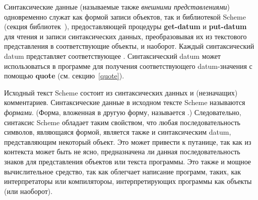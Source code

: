 Синтаксические данные (называемые также \textit{внешними представлениями}) одновременно служат как формой записи объектов, так и библиотекой Scheme
{\bfseries{}} (секция библиотек~),
предоставляющей процедуры {\cf\bfseries get-datum} и {\cf\bfseries put-datum} для чтения и
записи синтаксических данных, преобразовывая их из текстового представления в
соответствующие объекты, и наоборот. Каждый синтаксический datum представляет соответствующее
. Синтаксический datum может использоваться в программе для
получения соответствующего datum-значения с помощью {\cf\bfseries quote}
(см. секцию~\ref{quote}).

Исходный текст Scheme состоит из синтаксических данных и (незначащих)
комментариев. Синтаксические данные в исходном тексте Scheme называются
\textit{формами}. (Форма, вложенная в другую форму, называется
.) Следовательно, синтаксис Scheme обладает таким свойством, что любая
последовательность символов, являющаяся формой, является также и синтаксическим datum,
представляющим некоторый объект. Это может привести к путанице, так как из контекста может
быть не ясно, предназначена ли данная последовательность знаков для представления объектов или
текста программы. Это также и мощное вычислительное средство, так как облегчает написание
программ, таких, как интерпретаторы или компилятороы, интерпретирующих программы как объекты
(или наоборот).

